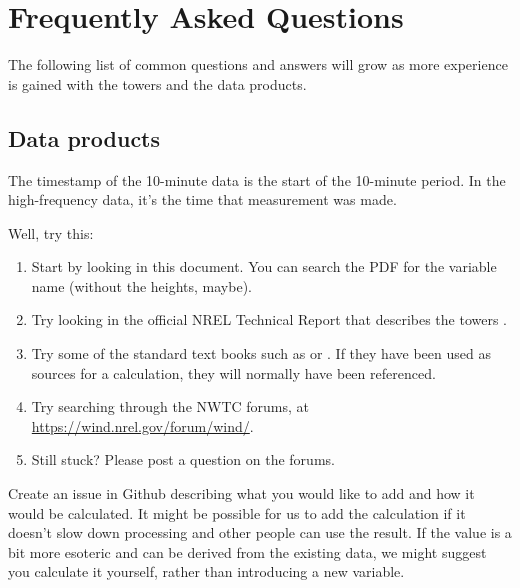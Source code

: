 \chapter{Frequently Asked Questions}
The following list of common questions and answers will grow as more experience is gained with the towers and the data products.

\section{Data products}
{The timestamp of the 10-minute data is the start of the 10-minute period. In the high-frequency data, it's the time that measurement was made.}

{Well, try this:
\begin{enumerate}
\item Start by looking in this document. You can search the PDF for the variable name (without the heights, maybe). 
\item Try looking in the official NREL Technical Report that describes the towers \citep{Clifton_55915}. 
\item Try some of the standard text books such as \cite{Stull_1988_a} or \cite{Garratt_1994_a}. If they have been used as sources for a calculation, they will normally have been referenced.
\item Try searching through the NWTC forums, at \url{https://wind.nrel.gov/forum/wind/}.
\item Still stuck? Please post a question on the forums. 
\end{enumerate}}

{Create an issue in Github describing what you would like to add and how it would be calculated. It might be possible for us to add the calculation if it doesn't slow down processing and other people can use the result. If the value is a bit more esoteric and can be derived from the existing data, we might suggest you calculate it yourself, rather than introducing a new variable.}

